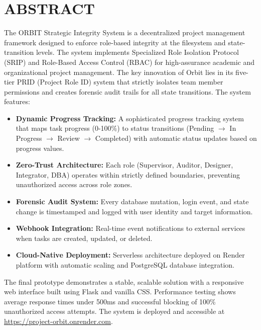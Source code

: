 ﻿\documentclass[12pt]{article}
\def\normaltext{\fontsize{12pt}{18pt}\color{secondary}}
\begin{document}
\section*{{\color{primary}ABSTRACT}}
\normaltext
The {\color{secondary}ORBIT Strategic Integrity System} is a decentralized project management framework designed to enforce role-based integrity at the filesystem and state-transition levels. The system implements Specialized Role Isolation Protocol (SRIP) and Role-Based Access Control (RBAC) for high-assurance academic and organizational project management.
\medskip
The key innovation of Orbit lies in its five-tier PRID (Project Role ID) system that strictly isolates team member permissions and creates forensic audit trails for all state transitions. The system features:
\begin{itemize}
\item \textbf{Dynamic Progress Tracking:} A sophisticated progress tracking system that maps task progress (0-100\%) to status transitions (Pending $\rightarrow$ In Progress $\rightarrow$ Review $\rightarrow$ Completed) with automatic status updates based on progress values.
\item \textbf{Zero-Trust Architecture:} Each role (Supervisor, Auditor, Designer, Integrator, DBA) operates within strictly defined boundaries, preventing unauthorized access across role zones.
\item \textbf{Forensic Audit System:} Every database mutation, login event, and state change is timestamped and logged with user identity and target information.
\item \textbf{Webhook Integration:} Real-time event notifications to external services when tasks are created, updated, or deleted.
\item \textbf{Cloud-Native Deployment:} Serverless architecture deployed on Render platform with automatic scaling and PostgreSQL database integration.
\end{itemize}
\medskip
The final prototype demonstrates a stable, scalable solution with a responsive web interface built using Flask and vanilla CSS. Performance testing shows average response times under 500ms and successful blocking of 100\% unauthorized access attempts. The system is deployed and accessible at \url{https://project-orbit.onrender.com}.
\newpage

\end{document}
